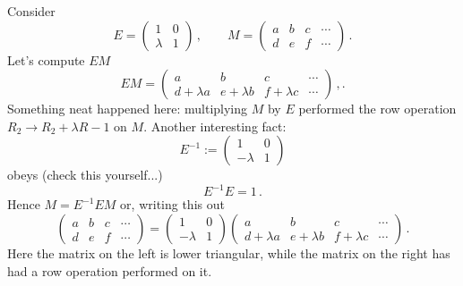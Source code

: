 \begin{example}
Consider \[E=\begin{pmatrix}1&0\\\lambda&1\end{pmatrix}\, ,\qquad M=\begin{pmatrix}a&b&c&\cdots\\d&e&f&\cdots\end{pmatrix}\, .\]
Let's compute $EM$
\[
EM=\begin{pmatrix}a&b&c&\cdots\\d+\lambda a&e+\lambda b&f+\lambda c&\cdots\end{pmatrix}\, ,.
\]
Something neat happened here: multiplying $M$ by $E$ performed the row operation $R_2\to R_2+\lambda R-1$ on $M$.
Another interesting fact:
\[
E^{-1}:=\begin{pmatrix}1&0\\-\lambda&1\end{pmatrix}
\] 
obeys (check this yourself...)
\[
E^{-1} E = 1\, .
\]
Hence $M=E^{-1} E M$ or, writing this out
\[
\begin{pmatrix}a&b&c&\cdots\\d&e&f&\cdots\end{pmatrix}=\begin{pmatrix}1&0\\-\lambda&1\end{pmatrix} \begin{pmatrix}a&b&c&\cdots\\d+\lambda a&e+\lambda b&f+\lambda c&\cdots\end{pmatrix}\, .
\]
Here the matrix on the left is lower triangular, while the matrix on the right has had a row operation performed on it.
\end{example}




